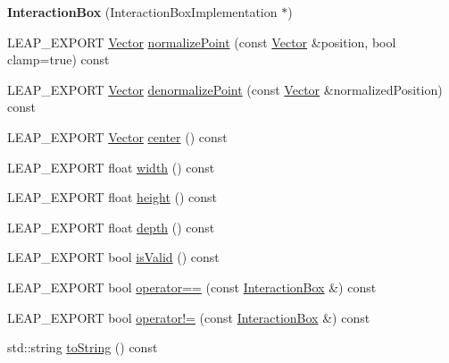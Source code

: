 \begin{DoxyCompactItemize}
\item 
\mbox{\label{class_leap_1_1_interaction_box_a4762a10792e968f9d8fb02c8a79d6597}} 
{\bfseries Interaction\+Box} (Interaction\+Box\+Implementation $\ast$)
\item 
L\+E\+A\+P\+\_\+\+E\+X\+P\+O\+RT \hyperlink{struct_leap_1_1_vector}{Vector} \hyperlink{class_leap_1_1_interaction_box_ad0e6082a1e640216b7d705552f09b754}{normalize\+Point} (const \hyperlink{struct_leap_1_1_vector}{Vector} \&position, bool clamp=true) const
\item 
L\+E\+A\+P\+\_\+\+E\+X\+P\+O\+RT \hyperlink{struct_leap_1_1_vector}{Vector} \hyperlink{class_leap_1_1_interaction_box_a7624e98e1327f4c5bdb79bf7a2aeacc3}{denormalize\+Point} (const \hyperlink{struct_leap_1_1_vector}{Vector} \&normalized\+Position) const
\item 
L\+E\+A\+P\+\_\+\+E\+X\+P\+O\+RT \hyperlink{struct_leap_1_1_vector}{Vector} \hyperlink{class_leap_1_1_interaction_box_afa8a46d30c62040123b10410dccdf2da}{center} () const
\item 
L\+E\+A\+P\+\_\+\+E\+X\+P\+O\+RT float \hyperlink{class_leap_1_1_interaction_box_a6aa65d89337305360c0de6b583cf15a0}{width} () const
\item 
L\+E\+A\+P\+\_\+\+E\+X\+P\+O\+RT float \hyperlink{class_leap_1_1_interaction_box_a75eab3cbd5e0ccdb117f2ea0ccefda32}{height} () const
\item 
L\+E\+A\+P\+\_\+\+E\+X\+P\+O\+RT float \hyperlink{class_leap_1_1_interaction_box_a94e804d28a471e149509aad631d473a0}{depth} () const
\item 
L\+E\+A\+P\+\_\+\+E\+X\+P\+O\+RT bool \hyperlink{class_leap_1_1_interaction_box_afe6398e502c6d38b6150d3512395d0c8}{is\+Valid} () const
\item 
L\+E\+A\+P\+\_\+\+E\+X\+P\+O\+RT bool \hyperlink{class_leap_1_1_interaction_box_a8739be15a1cc736680809aecc624165a}{operator==} (const \hyperlink{class_leap_1_1_interaction_box}{Interaction\+Box} \&) const
\item 
L\+E\+A\+P\+\_\+\+E\+X\+P\+O\+RT bool \hyperlink{class_leap_1_1_interaction_box_aaa512ca12a6c0f3326e9998787d31ef1}{operator!=} (const \hyperlink{class_leap_1_1_interaction_box}{Interaction\+Box} \&) const
\item 
std\+::string \hyperlink{class_leap_1_1_interaction_box_a94603838150c2885c27bb714a28b5d8f}{to\+String} () const
\end{DoxyCompactItemize}
